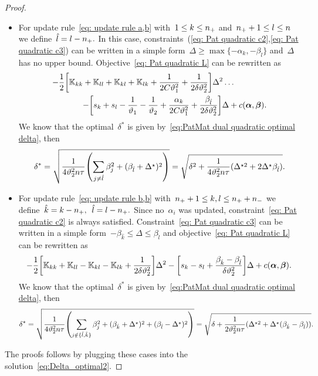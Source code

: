 \begin{proof}
\begin{itemize}
    \item For update rule~\eqref{eq: update rule a,b} with~$1 \le k \le n_{+}$ and~$n_{+} + 1 \le l \le n$ we define~$\hat{l} = l - n_{+}.$ In this case, constraints~(\ref{eq: Pat quadratic c2},\ref{eq: Pat quadratic c3}) can be written in a simple form~$\Delta \geq \max \{- \alpha_k, - \beta_{\hat{l}}\}$ and~$\Delta$ has no upper bound. Objective~\eqref{eq: Pat quadratic L} can be rewritten as
    \begin{equation*}
      \begin{split}
        - \frac{1}{2} \Brac[s]{\K_{kk} + \K_{ll} + \K_{kl} + \K_{lk} + \frac{1}{2C\vartheta_1^2} + \frac{1}{2\delta\vartheta_2^2}} \Delta^2 \dots \qquad\qquad \\ 
        - \Brac[s]{s_k + s_l - \frac{1}{\vartheta_1} - \frac{1}{\vartheta_2} + \frac{\alpha_k}{2C\vartheta_1^2} + \frac{\beta_{\hat{l}}}{2\delta\vartheta_2^2}} \Delta + c(\bm{\alpha}, \bm{\beta}).
      \end{split}
    \end{equation*}
    We know that the optimal~$\delta^*$ is given by~\eqref{eq:PatMat dual quadratic optimal delta}, then
    \begin{equation*}
      \delta^*
      = \sqrt{\frac{1}{4\vartheta_2^2 n \tau} \Brac{\sum_{j\neq \hat{l}} \beta_j^2 + (\beta_{\hat{l}} + \Delta^\star)^2}}
      = \sqrt{\delta^2 + \frac{1}{4\vartheta_2^2 n \tau} (\Delta^{\star2} + 2\Delta^\star \beta_{\hat{l}})}.
    \end{equation*}

    \item For update rule~\eqref{eq: update rule b,b} with~$n_{+} + 1\le k,l \le n_{+} + n_{-}$ we define~$\hat{k} = k - n_{+},$~$\hat{l} = l - n_{+}.$ Since no~$\alpha_i$ was updated, constraint~\eqref{eq: Pat quadratic c2} is always satisfied. Constraint~\eqref{eq: Pat quadratic c3} can be written in a simple form~$-\beta_{\hat{k}} \leq \Delta \leq \beta_{\hat{l}}$ and objective~\eqref{eq: Pat quadratic L} can be rewritten as
    \begin{equation*}
      - \frac{1}{2} \Brac[s]{\K_{kk} + \K_{ll} - \K_{kl} - \K_{lk} + \frac{1}{2\delta\vartheta_2^2}} \Delta^2 - \Brac[s]{s_k - s_l + \frac{\beta_{\hat{k}} - \beta_{\hat{l}}}{\delta\vartheta_2^2}} \Delta + c(\bm{\alpha}, \bm{\beta}).
    \end{equation*}
    We know that the optimal~$\delta^*$ is given by~\eqref{eq:PatMat dual quadratic optimal delta}, then
    \begin{equation*}
      \delta^*
      = \sqrt{\frac{1}{4\vartheta_2^2 n \tau} \Brac{\sum_{j \notin \{\hat{l}, \hat{k}\}} \beta_j^2 + (\beta_{\hat{k}} + \Delta^\star)^2 + (\beta_{\hat{l}} - \Delta^\star)^2}} 
      = \sqrt{\delta + \frac{1}{2\vartheta_2^2 n \tau} (\Delta^{\star2} + \Delta^\star (\beta_{\hat{k}} - \beta_{\hat{l}}))}.
    \end{equation*}
  \end{itemize}
  The proofs follows by plugging these cases into the solution~\eqref{eq:Delta_optimal2}.
\end{proof}
